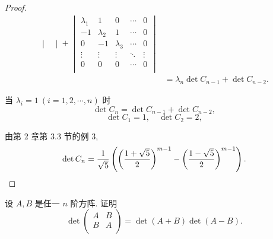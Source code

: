 \documentclass{ctexart}
\begin{document}
\begin{proof}
\begin{align*}
\begin{vmatrix}
    \end{vmatrix}+\begin{vmatrix}
        \lambda_1 & 1 & 0 & \cdots & 0 \\
        -1 & \lambda_2 & 1 & \cdots & 0 \\
        0 & -1 & \lambda_3 & \cdots & 0 \\
        \vdots & \vdots & \vdots & \ddots & \vdots \\
        0 & 0 & 0 & \cdots & 0 \\
    \end{vmatrix} \\
        & =\lambda_n\det C_{n-1}+\det C_{n-2}.
    \end{align*}

    当 $\lambda_i=1\ (i=1,2,\cdots,n)$ 时
    \[\det C_n=\det C_{n-1}+\det C_{n-2},\]
    \[\det C_1=1,\quad\det C_2=2,\]

    由第 2 章第 3.3 节的例 3,
    \[\det C_n=\dfrac{1}{\sqrt{5}}\left(\left(\dfrac{1+\sqrt{5}}{2}\right)^{m-1}-\left(\dfrac{1-\sqrt{5}}{2}\right)^{m-1}\right).\qedhere\]
\end{proof}
\begin{exercise}[2.8]
    设 $A,B$ 是任一 $n$ 阶方阵. 证明
    \[\det\begin{pmatrix}
        A & B \\
        B & A \\
    \end{pmatrix}=\det(A+B)\det(A-B).\]
\end{exercise}
\end{document}

